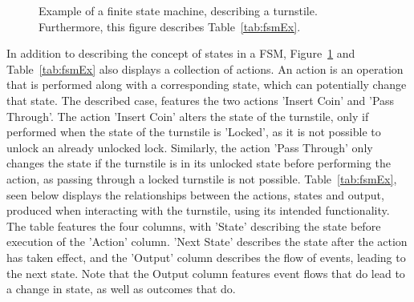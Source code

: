 \begin{figure}[h]
  \centering
  \caption{Example of a finite state machine, describing a turnstile. Furthermore, this figure describes Table~\ref{tab:fsmEx}.}
  \label{fig:fsmEx}
\end{figure}
In addition to describing the concept of states in a FSM, Figure~\ref{fig:fsmEx} and Table~\ref{tab:fsmEx} also displays a collection of actions. An action is an operation that is performed along with a corresponding state, which can potentially change that state. The described case, features the two actions 'Insert Coin' and 'Pass Through'. The action 'Insert Coin' alters the state of the turnstile, only if performed when the state of the turnstile is 'Locked', as it is not possible to unlock an already unlocked lock. Similarly, the action 'Pass Through' only changes the state if the turnstile is in its unlocked state before performing the action, as passing through a locked turnstile is not possible.
\newpage
\noindent
Table~\ref{tab:fsmEx}, seen below displays the relationships between the actions, states and output, produced when interacting with the turnstile, using its intended functionality. The table features the four columns, with 'State' describing the state before execution of the 'Action' column. 'Next State' describes the state after the action has taken effect, and the 'Output' column describes the flow of events, leading to the next state. Note that the Output column features event flows that do  lead to a change in state, as well as outcomes that do.
